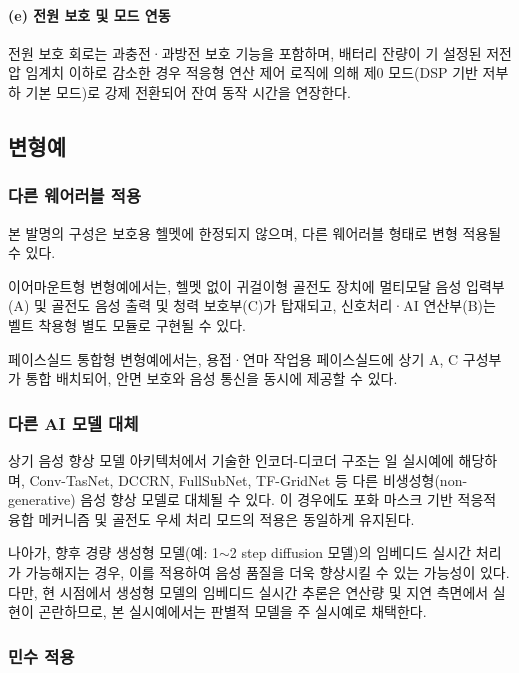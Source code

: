 \documentclass{article}
\DeclareRobustCommand{\codexedit}[1]{\textcolor{customorange}{#1}}
\begin{document}
\paragraph{(e) 전원 보호 및 모드 연동}

\codexedit{전원 보호 회로는 과충전·과방전 보호 기능을 포함하며, 배터리 잔량이 기 설정된 저전압 임계치 이하로 감소한 경우 적응형 연산 제어 로직에 의해 제0 모드(DSP 기반 저부하 기본 모드)로 강제 전환되어 잔여 동작 시간을 연장한다.}

\subsection{변형예}

\subsubsection{다른 웨어러블 적용}

본 발명의 구성은 보호용 헬멧에 한정되지 않으며, 다른 웨어러블 형태로 변형 적용될 수 있다.

이어마운트형 변형예에서는, 헬멧 없이 귀걸이형 골전도 장치에 멀티모달 음성 입력부(A) 및 골전도 음성 출력 및 청력 보호부(C)가 탑재되고, 신호처리·AI 연산부(B)는 벨트 착용형 별도 모듈로 구현될 수 있다.

페이스실드 통합형 변형예에서는, 용접·연마 작업용 페이스실드에 상기 A, C 구성부가 통합 배치되어, 안면 보호와 음성 통신을 동시에 제공할 수 있다.

\subsubsection{다른 AI 모델 대체}

\codexedit{상기 음성 향상 모델 아키텍처에서 기술한 인코더-디코더 구조는 일 실시예에 해당하며, Conv-TasNet, DCCRN, FullSubNet, TF-GridNet 등 다른 비생성형(non-generative) 음성 향상 모델로 대체될 수 있다. 이 경우에도 포화 마스크 기반 적응적 융합 메커니즘 및 골전도 우세 처리 모드의 적용은 동일하게 유지된다.}

나아가, 향후 경량 생성형 모델(예: 1$\sim$2 step diffusion 모델)의 임베디드 실시간 처리가 가능해지는 경우, 이를 적용하여 음성 품질을 더욱 향상시킬 수 있는 가능성이 있다. 다만, 현 시점에서 생성형 모델의 임베디드 실시간 추론은 연산량 및 지연 측면에서 실현이 곤란하므로, 본 실시예에서는 판별적 모델을 주 실시예로 채택한다.

\subsubsection{민수 적용}
\end{document}
